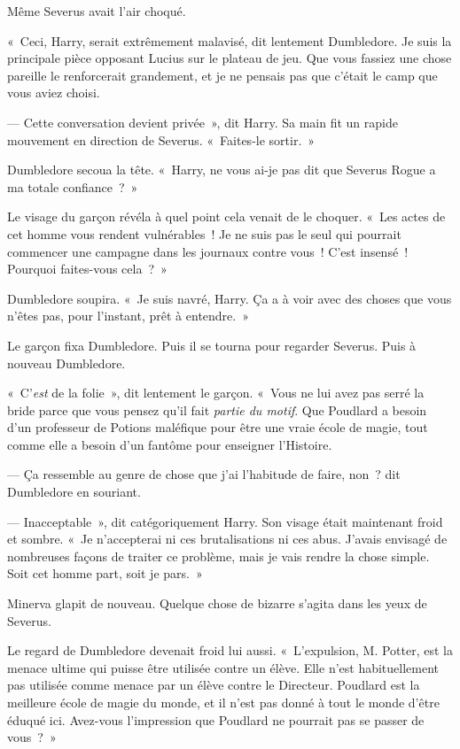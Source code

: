 Même Severus avait l'air choqué.

«~Ceci, Harry, serait extrêmement malavisé, dit lentement Dumbledore.
Je suis la principale pièce opposant Lucius sur le plateau de jeu.
Que vous fassiez une chose pareille le renforcerait grandement, et je ne pensais pas que c'était le camp que vous aviez choisi.

--- Cette conversation devient privée~», dit Harry.
Sa main fit un rapide mouvement en direction de Severus.
«~Faites-le sortir.~»

Dumbledore secoua la tête.
«~Harry, ne vous ai-je pas dit que Severus Rogue a ma totale confiance~?~»

Le visage du garçon révéla à quel point cela venait de le choquer.
«~Les actes de cet homme vous rendent vulnérables~!
Je ne suis pas le seul qui pourrait commencer une campagne dans les journaux contre vous~!
C'est insensé~!
Pourquoi faites-vous cela~?~»

Dumbledore soupira.
«~Je suis navré, Harry.
Ça a à voir avec des choses que vous n'êtes pas, pour l'instant, prêt à entendre.~»

Le garçon fixa Dumbledore.
Puis il se tourna pour regarder Severus.
Puis à nouveau Dumbledore.

«~C'\emph{est} de la folie~», dit lentement le garçon.
«~Vous ne lui avez pas serré la bride parce que vous pensez qu'il fait \emph{partie du motif}.
Que Poudlard a besoin d'un professeur de Potions maléfique pour être une vraie école de magie, tout comme elle a besoin d'un fantôme pour enseigner l'Histoire.

--- Ça ressemble au genre de chose que j'ai l'habitude de faire, non~? dit Dumbledore en souriant.

--- Inacceptable~», dit catégoriquement Harry.
Son visage était maintenant froid et sombre.
«~Je n'accepterai ni ces brutalisations ni ces abus.
J'avais envisagé de nombreuses façons de traiter ce problème, mais je vais rendre la chose simple.
Soit cet homme part, soit je pars.~»

Minerva glapit de nouveau.
Quelque chose de bizarre s'agita dans les yeux de Severus.

Le regard de Dumbledore devenait froid lui aussi.
«~L'expulsion, M. Potter, est la menace ultime qui puisse être utilisée contre un élève.
Elle n'est habituellement pas utilisée comme menace par un élève contre le Directeur.
Poudlard est la meilleure école de magie du monde, et il n'est pas donné à tout le monde d'être éduqué ici.
Avez-vous l'impression que Poudlard ne pourrait pas se passer de vous~?~»

